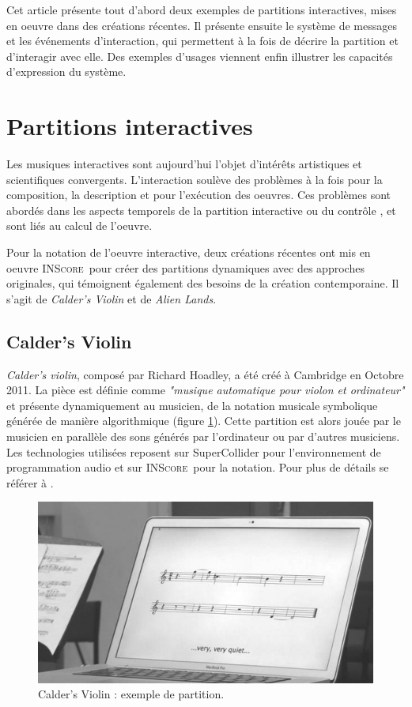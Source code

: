 \documentclass{article}
\newcommand{\inscore}		{\textsc{\small INScore}}
\begin{document}
Cet article présente tout d'abord deux exemples de partitions interactives, mises en oeuvre dans des créations récentes. Il présente ensuite le système de messages et les événements d'interaction, qui permettent à la fois de décrire la partition et d'interagir avec elle. Des exemples d'usages viennent enfin illustrer les capacités d'expression du système. 


\section{Partitions interactives}

Les musiques interactives sont aujourd'hui l'objet d'intérêts artistiques et scientifiques convergents. L'interaction soulève des problèmes à la fois pour la composition, la description et pour l'exécution des oeuvres. Ces problèmes sont abordés dans les aspects temporels de la partition interactive \cite{allombert09} ou du contrôle \cite{acont08}, et sont liés au calcul de l'oeuvre.

Pour la notation de l'oeuvre interactive, deux créations récentes ont mis en oeuvre \inscore\ pour créer des partitions dynamiques avec des approches originales, qui témoignent également des besoins de la création contemporaine. Il s'agit de \emph{Calder's Violin} et de \emph{Alien Lands}.

\subsection{Calder's Violin}
\textit{Calder's violin}, composé par Richard Hoadley, a été créé à Cambridge en Octobre 2011. La pièce est définie comme \emph{"musique automatique pour violon et ordinateur"} et présente dynamiquement au musicien, de la notation musicale symbolique générée de manière algorithmique (figure \ref{fig:cv}). Cette partition est alors jouée par le musicien en parallèle des sons générés par l'ordinateur ou par d'autres musiciens. Les technologies utilisées reposent sur SuperCollider pour l'environnement de programmation audio et sur \inscore\ pour la notation. Pour plus de détails se référer à \cite{Hoadley12}. 

\begin{figure}[htbp]
\centerline{
	\includegraphics[width=0.9\columnwidth]{imgs/caldersv}}
\caption{Calder's Violin : exemple de partition.}
\label{fig:cv}
\end{figure}
\end{document}
